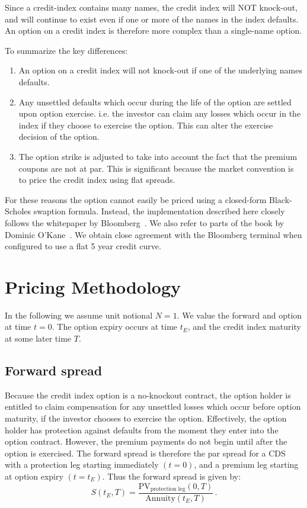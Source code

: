 \documentclass[11pt]{article}
\begin{document}
Since a credit-index contains many names, the credit index will NOT knock-out, and will continue to exist even if one or more of the names in the index defaults. An option on a credit index is therefore more complex than a single-name option. 

To summarize the key differences:
\begin{enumerate}
	\item An option on a credit index will not knock-out if one of the underlying names defaults.
	
	\item Any unsettled defaults which occur during the life of the option are settled upon option exercise. i.e. the investor can claim any losses which occur in the index if they choose to exercise the option. This can alter the exercise decision of the option.
	
	\item The option strike is adjusted to take into account the fact that the premium coupons are not at par. This is significant because the market convention is to price the credit index using flat spreads.
\end{enumerate}

For these reasons the option cannot easily be priced using a closed-form Black-Scholes swaption formula. Instead, the implementation described here closely follows the whitepaper by Bloomberg~\cite{BloombergCreditIndexOption}. We also refer to parts of the book by Dominic O'Kane~\cite{DominicOKane}. We obtain close agreement with the Bloomberg terminal when configured to use a flat 5 year credit curve.

\section{Pricing Methodology}

In the following we assume unit notional $N = 1$. We value the forward and option at time $t=0$. The option expiry occurs at time $t_E$, and the credit index maturity at some later time $T$.

\subsection{Forward spread}

Because the credit index option is a no-knockout contract, the option holder is entitled to claim compensation for any unsettled losses which occur before option maturity, if the investor chooses to exercise the option. Effectively, the option holder has protection against defaults from the moment they enter into the option contract. However, the premium payments do not begin until after the option is exercised. The forward spread is therefore the par spread for a CDS with a protection leg starting immediately $(t=0)$, and a premium leg starting at option expiry $(t=t_E)$. Thus the forward spread is given by:
\begin{equation}
S(t_E, T ) = \frac{ \mbox{PV}_{\mbox{protection leg}}
	(0, T)} {\mbox{Annuity}(t_E,T)} \,.
\label{indexForwardSpread}
\end{equation}
\end{document}
